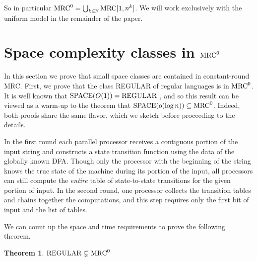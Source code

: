 \documentclass[11pt]{article}
\newtheorem{theorem}{Theorem}
\theoremstyle{definition}
\theoremstyle{remark}
\newcommand{\N}{\mathbb{N}}
\newcommand{\mrc}{\textup{MRC}}
\begin{document}
So in particular $\mrc^0=\bigcup_{k\in\N}\text{MRC}[1,n^k]$. We will work
exclusively with the uniform model in the remainder of the paper.

\section{Space complexity classes in $\mrc^0$} \label{sec:spacebound}

In this section we prove that small space classes are contained in
constant-round MRC. First, we prove that the class REGULAR of regular languages
is in $\mrc^0$. It is well known that $\textup{SPACE}(O(1)) = \textup{REGULAR}$
\cite{Shepherdson59}, and so this result can be viewed as a warm-up to the
theorem that $\textup{SPACE}(o(\log n)) \subseteq \mrc^0$. Indeed, both proofs
share the same flavor, which we sketch before proceeding to the details.

In the first round each parallel processor receives a contiguous portion of the
input string and constructs a state transition function using the data of the
globally known DFA. Though only the processor with the beginning of the string
knows the true state of the machine during its portion of the input, all
processors can still compute the \emph{entire} table of state-to-state
transitions for the given portion of input. In the second round, one processor
collects the transition tables and chains together the computations, and this
step requires only the first bit of input and the list of tables.

We can count up the space and time requirements to prove the following theorem.

\begin{theorem}\label{thm:reg}
   $\textup{REGULAR} \subsetneq \mrc^0$
\end{theorem}
\end{document}
